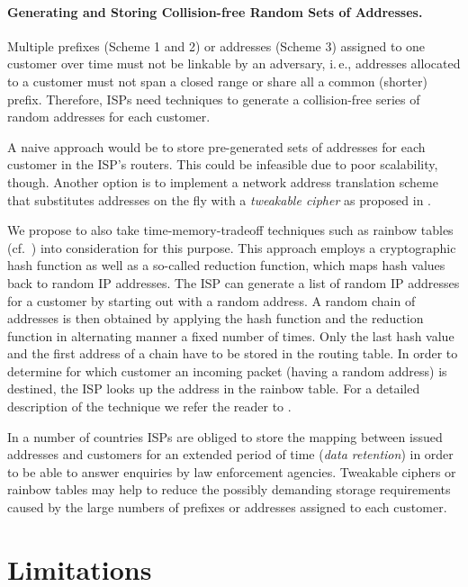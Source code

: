 \documentclass{easychair}
\begin{document}
\paragraph{Generating and Storing Collision-free Random Sets of Addresses.}

Multiple prefixes (Scheme 1 and 2) or addresses (Scheme 3) assigned to one customer over time must not be linkable by an adversary, i.\,e., addresses allocated to a customer must not span a closed range or share all a common (shorter) prefix. Therefore, ISPs need techniques to generate  a collision-free series of random addresses for each customer.

A naive approach would be to store pre-generated sets of addresses for each customer in the ISP's routers. This could be infeasible due to poor scalability, though. Another option is to implement a network address translation scheme that substitutes addresses on the fly with a \emph{tweakable cipher} as proposed in \cite{Enlisting-ISPs}.

We propose to also take time-memory-tradeoff techniques such as rainbow tables (cf.~\cite{Oechslin2011}) into consideration for this purpose. This approach employs a cryptographic hash function as well as a so-called reduction function, which maps hash values back to random IP addresses. The ISP can generate a list of random IP addresses for a customer by starting out with a random address. A random chain of addresses is then obtained by applying the hash function and the reduction function in alternating manner a fixed number of times. Only the last hash value and the first address of a chain have to be stored in the routing table. In order to determine for which customer an incoming packet (having a random address) is destined, the ISP looks up the address in the rainbow table. For a detailed description of the technique we refer the reader to \cite{Oechslin2011}.

In a number of countries ISPs are obliged to store the mapping between issued addresses and customers for an extended period of time (\emph{data retention}) in order to be able to answer enquiries by law enforcement agencies. Tweakable ciphers or rainbow tables may help to reduce the possibly demanding storage requirements caused by the large numbers of prefixes or addresses assigned to each customer.




\section{Limitations}
\label{sec:limitations}
\end{document}
